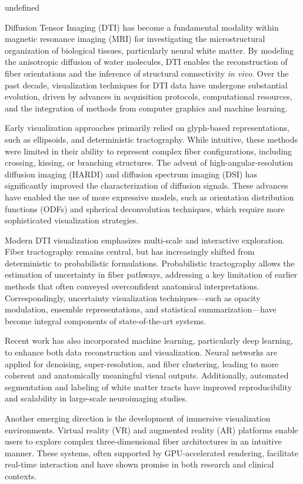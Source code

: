 undefined

Diffusion Tensor Imaging (DTI) has become a fundamental modality within magnetic resonance imaging (MRI) for investigating the microstructural organization of biological tissues, particularly neural white matter. By modeling the anisotropic diffusion of water molecules, DTI enables the reconstruction of fiber orientations and the inference of structural connectivity \emph{in vivo}. Over the past decade, visualization techniques for DTI data have undergone substantial evolution, driven by advances in acquisition protocols, computational resources, and the integration of methods from computer graphics and machine learning.

Early visualization approaches primarily relied on glyph-based representations, such as ellipsoids, and deterministic tractography. While intuitive, these methods were limited in their ability to represent complex fiber configurations, including crossing, kissing, or branching structures. The advent of high-angular-resolution diffusion imaging (HARDI) and diffusion spectrum imaging (DSI) has significantly improved the characterization of diffusion signals. These advances have enabled the use of more expressive models, such as orientation distribution functions (ODFs) and spherical deconvolution techniques, which require more sophisticated visualization strategies.

Modern DTI visualization emphasizes multi-scale and interactive exploration. Fiber tractography remains central, but has increasingly shifted from deterministic to probabilistic formulations. Probabilistic tractography allows the estimation of uncertainty in fiber pathways, addressing a key limitation of earlier methods that often conveyed overconfident anatomical interpretations. Correspondingly, uncertainty visualization techniques—such as opacity modulation, ensemble representations, and statistical summarization—have become integral components of state-of-the-art systems.

Recent work has also incorporated machine learning, particularly deep learning, to enhance both data reconstruction and visualization. Neural networks are applied for denoising, super-resolution, and fiber clustering, leading to more coherent and anatomically meaningful visual outputs. Additionally, automated segmentation and labeling of white matter tracts have improved reproducibility and scalability in large-scale neuroimaging studies.

Another emerging direction is the development of immersive visualization environments. Virtual reality (VR) and augmented reality (AR) platforms enable users to explore complex three-dimensional fiber architectures in an intuitive manner. These systems, often supported by GPU-accelerated rendering, facilitate real-time interaction and have shown promise in both research and clinical contexts.

